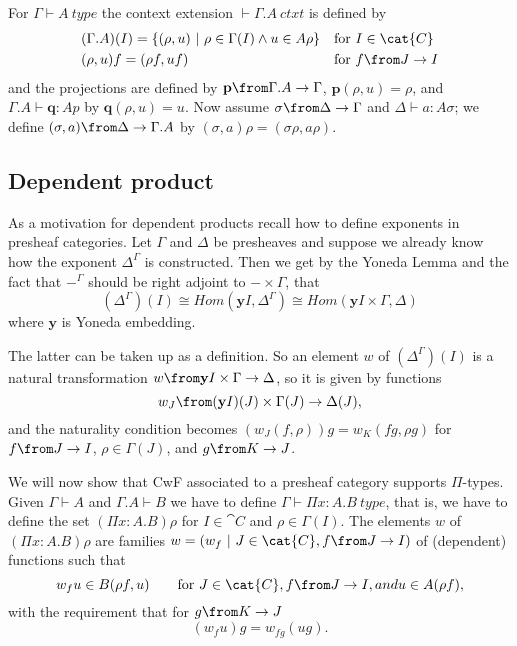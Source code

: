 For $\Gamma \vdash A~type$ the context extension $\vdash \Gamma.A~ctxt$ is
defined by
\begin{align*}
  &(\Gamma.A)(I) = \{(\rho, u)~|~\rho \in \Gamma(I) \land u \in A \rho\} &&
  \text{for $I \in \cat{C}$}\\
  &(\rho, u)f = (\rho f, u f) && \text{for $f \from J \to I$}
\end{align*}
and the projections are defined by $\mathbf{p} \from \Gamma.A \to \Gamma$,
$\mathbf{p}(\rho, u) = \rho$, and $\Gamma.A \vdash \mathbf{q} : Ap$ by
$\mathbf{q}(\rho, u) = u$.  Now assume $\sigma \from \Delta \to \Gamma$ and
$\Delta \vdash a : A\sigma$; we define $(\sigma, a) \from \Delta \to \Gamma.A$
by $(\sigma, a)\rho = (\sigma \rho, a \rho)$.

\subsection*{Dependent product}

As a motivation for dependent products recall how to define exponents in
presheaf categories. Let $\Gamma$ and $\Delta$ be presheaves and suppose we
already know how the exponent $\Delta^\Gamma$ is constructed. Then we get by
the Yoneda Lemma and the fact that $-^\Gamma$ should be right adjoint to $-
\times \Gamma$, that
\[
  (\Delta^\Gamma)(I) \cong Hom(\mathbf{y}I, \Delta^\Gamma) \cong Hom(\mathbf{y}I \times \Gamma, \Delta)
\]
where $\mathbf{y}$ is Yoneda embedding.

The latter can be taken up as a definition. So an element $w$ of
$(\Delta^\Gamma)(I)$ is a natural transformation $w \from \mathbf{y}I\times
\Gamma \to \Delta$, so it is given by functions
\[
  w_J \from (\mathbf{y}I)(J) \times \Gamma(J) \to \Delta(J),
\]
and the naturality condition becomes $(w_J(f, \rho))g = w_K(fg, \rho g)$ for $f
\from J \to I$, $\rho \in \Gamma(J)$, and $g \from K \to J$.

We will now show that CwF associated to a presheaf category supports
$\Pi$-types. Given $\Gamma \vdash A$ and $\Gamma.A \vdash B$ we have to define
$\Gamma \vdash \Pi x: A. B~type$, that is, we have to define the set $(\Pi x:
A.B) \rho$ for $I \in \cat{C}$ and $\rho \in \Gamma(I)$. The elements $w$ of
$(\Pi x:A.B)\rho$ are families $w = (w_f~|~J\in \cat{C}, f \from J \to I)$ of
(dependent) functions such that
\[
  w_f u \in B(\rho f, u) \qquad \text{for $J \in \cat{C}, f \from J \to I, and u \in A(\rho f)$},
\]
with the requirement that for $g \from K \to J$
\[
  (w_f u)g = w_{fg}(ug).
\]

